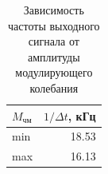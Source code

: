 \begin{table}[htbp]
  \centering
  \caption{Зависимость частоты выходного сигнала от амплитуды модулирующего колебания}
    \begin{tabular}{|l|r|}
    \toprule
    $M_\text{чм}$     & \multicolumn{1}{l|}{$1/ \Delta t$, кГц} \\
    \midrule
    min   & 18.53 \\
    \midrule
    max   & 16.13 \\
    \bottomrule
    \end{tabular}%
  \label{tab:tab4}%
\end{table}%

